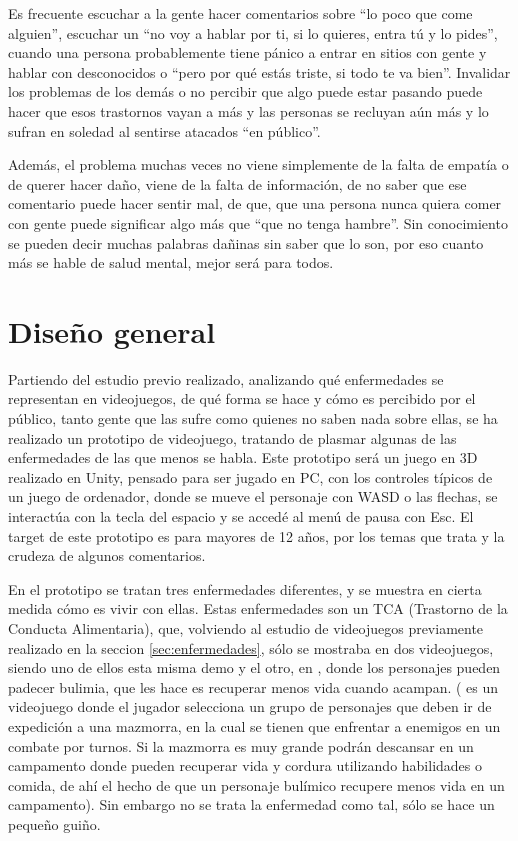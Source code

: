 \documentclass[12pt, a4paper,twoside,titlepage]{book}
\begin{document}
Es frecuente escuchar a la gente hacer comentarios sobre ``lo poco que come alguien'', escuchar un ``no voy a hablar por ti, si lo quieres, entra tú y lo pides'', cuando una persona probablemente tiene pánico a entrar en sitios con gente y hablar con desconocidos o ``pero por qué estás triste, si todo te va bien''. Invalidar los problemas de los demás o no percibir que algo puede estar pasando puede hacer que esos trastornos vayan a más y las personas se recluyan aún más y lo sufran en soledad al sentirse atacados ``en público''. 

Además, el problema muchas veces no viene simplemente de la falta de empatía o de querer hacer daño, viene de la falta de información, de no saber que ese comentario puede hacer sentir mal, de que, que una persona nunca quiera comer con gente puede significar algo más que ``que no tenga hambre''. Sin conocimiento se pueden decir muchas palabras dañinas sin saber que lo son, por eso cuanto más se hable de salud mental, mejor será para todos. 

\label{sec:diseño}
\section{Diseño general}
Partiendo del estudio previo realizado, analizando qué enfermedades se representan en videojuegos, de qué forma se hace y cómo es percibido por el público, tanto gente que las sufre como quienes no saben nada sobre ellas, se ha realizado un prototipo de videojuego, tratando de plasmar algunas de las enfermedades de las que menos se habla. Este prototipo será un juego en 3D realizado en Unity, pensado para ser jugado en PC, con los controles típicos de un juego de ordenador, donde se mueve el personaje con WASD o las flechas, se interactúa con la tecla del espacio y se accedé al menú de pausa con Esc. El target de este prototipo es para mayores de 12 años, por los temas que trata y la crudeza de algunos comentarios.  

En el prototipo se tratan tres enfermedades diferentes, y se muestra en cierta medida cómo es vivir con ellas. Estas enfermedades son un TCA (Trastorno de la Conducta Alimentaria), que, volviendo al estudio de videojuegos previamente realizado en la seccion \ref{sec:enfermedades}, sólo se mostraba en dos videojuegos, siendo uno de ellos esta misma demo y el otro, en , donde los personajes pueden padecer bulimia, que les hace es recuperar menos vida cuando acampan. ( es un videojuego donde el jugador selecciona un grupo de personajes que deben ir de expedición a una mazmorra, en la cual se tienen que enfrentar a enemigos en un combate por turnos. Si la mazmorra es muy grande podrán descansar en un campamento donde pueden recuperar vida y cordura utilizando habilidades o comida, de ahí el hecho de que un personaje bulímico recupere menos vida en un campamento). Sin embargo no se trata la enfermedad como tal, sólo se hace un pequeño guiño. 
\end{document}
